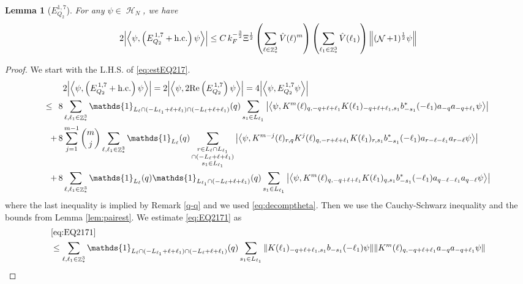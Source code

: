 \documentclass[sn-mathphys, Numbered ,a4paper]{sn-jnl}%
\DeclareMathOperator{\Z}{\mathbb{Z}}
\DeclareMathOperator{\HH}{\mathcal{H}}
\DeclareMathOperator{\NN}{\mathcal{N}}
\newcommand{\half}{\frac{1}{2}}
\newcommand{\eva}[1]{\left\langle #1 \right\rangle}
\theoremstyle{plain}
\newtheorem{lemma}[theorem]{Lemma}
\theoremstyle{definition}
\theoremstyle{remark}
\theoremstyle{plain}
\theoremstyle{definition}
\theoremstyle{remark}
\begin{document}
\begin{lemma}[$E_{Q_2}^{1,7}$]\label{lem:EQ217}
	For any $\psi \in \HH_N$, we have
	\begin{align}
		2\abs{\eva{\psi,\left(E^{\,1,7}_{Q_2}+\mathrm{h.c.}\right) \psi }}
		\leq C\, k_{F}^{-\frac{3}{2}} \Xi^{\half} \left(\sum\limits_{\ell\in \Z^3_*} \hat{V}(\ell)^m \right) \left(\sum\limits_{\ell_1\in \Z^3_*} \hat{V}(\ell_1) \right) \norm{(\NN+1)^\half \psi } \label{eq:estEQ217}
	\end{align}
\end{lemma}
\begin{proof}
 We start with the L.H.S. of \eqref{eq:estEQ217}.
\begin{align}
	&2\abs{\eva{\psi,\left(E^{\,1,7}_{Q_2}+\mathrm{h.c.}\right) \psi }} =2 \abs{\eva{\psi,2\mathrm{Re}\left(E^{\,1,7}_{Q_2}\right) \psi }} = 4\abs{\eva{\psi, E^{\,1,7}_{Q_2} \psi }}\nonumber\\
	\leq\,\;8& \sum\limits_{\ell, \ell_1\in \Z^3_*} \mathds{1}_{L_{\ell} \cap (-L_{\ell_1}+\ell+\ell_1) \cap (-L_{\ell}+\ell+\ell_1)}(q) \sum\limits_{s_1 \in L_{\ell_1}} \abs{\eva{\psi, K^m(\ell)_{q,-q+\ell+\ell_1} K(\ell_1)_{-q+\ell+\ell_1,s_1} b^*_{-s_1}(-\ell_1) a_{-q} a_{-q+\ell_1} \psi}} \label{eq:EQ2171}\\
	+\,8& \sum\limits_{j=1}^{m-1} {{m}\choose j} \sum\limits_{\ell, \ell_1\in \Z^3_*}\mathds{1}_{L_{\ell}}(q) \sum\limits_{\substack{r\in L_{\ell} \cap L_{\ell_1} \\ \cap (-L_{\ell}+\ell+\ell_1)\\s_1\in L_{\ell_1}}}  \abs{\eva{\psi, K^{m-j}(\ell)_{r,q} K^j(\ell)_{q,-r+\ell+\ell_1} K(\ell_1)_{r,s_1} b^*_{-s_1}(-\ell_1)a_{r-\ell-\ell_1}a_{r-\ell} \psi }} \label{eq:EQ2172}\\
	+\,8&\sum\limits_{\ell, \ell_1\in \Z^3_*} \mathds{1}_{L_{\ell}}(q) \mathds{1}_{L_{\ell_1}\cap (-L_{\ell}+\ell+\ell_1)}(q) \sum\limits_{s_1\in L_{\ell_1}} \abs{\eva{\psi, K^m(\ell)_{q,-q+\ell+\ell_1} K(\ell_1)_{q,s_1} b^*_{-s_1}(-\ell_1)a_{q-\ell-\ell_1}a_{q-\ell} \psi }} \label{eq:EQ2173}
\end{align}
where the last inequality is implied by Remark \ref{q-q} and we used \eqref{eq:decomptheta}.
Then we use the Cauchy-Schwarz inequality and the bounds from Lemma \ref{lem:pairest}.
We estimate \eqref{eq:EQ2171} as 
\begin{align}
	&\eqref{eq:EQ2171}\nonumber\\
	&\leq \sum\limits_{\ell, \ell_1\in \Z^3_*} \mathds{1}_{L_{\ell} \cap (-L_{\ell_1}+\ell+\ell_1) \cap (-L_{\ell}+\ell+\ell_1)}(q) \sum\limits_{s_1 \in L_{\ell_1}} \norm{  K(\ell_1)_{-q+\ell+\ell_1,s_1} b_{-s_1}(-\ell_1) \psi}\norm{ K^m(\ell)_{q,-q+\ell+\ell_1}a_{-q}a_{-q+\ell_1} \psi }\nonumber\\

\end{align}
\end{proof}
\end{document}

